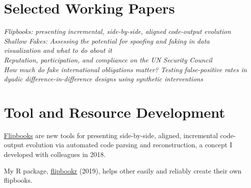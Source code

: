 \documentclass[margin, 10pt]{CVStyleTemplate}\usepackage[]{graphicx}\usepackage[dvipsnames]{xcolor}
\begin{document}
\begin{resume}
%


\section{Selected Working Papers}


\emph{Flipbooks: presenting incremental, side-by-side, aligned code-output evolution}\\[6pt]
\emph{Shallow Fakes: Assessing the potential for spoofing and faking in data visualization and what to do about it}\\[6pt]
\emph{Reputation, participation, and compliance on the UN Security Council}\\[6pt]
\emph{How much do \emph{fake} international obligations matter?  Testing false-positive rates in dyadic difference-in-difference designs using synthetic interventions}\\[6pt]

\section{Tool and Resource Development}

\href{https://evamaerey.github.io/little_flipbooks_library/about/what_the_flipbook}{Flipbooks} are new tools for presenting side-by-side, aligned, incremental code-output evolution via automated code parsing and reconstruction, a concept I developed with colleagues in 2018.



My R package, \href{https://github.com/EvaMaeRey/flipbookr}{flipbookr} (2019), helps other easily and reliably create their own flipbooks.


\end{resume}
\end{document}
